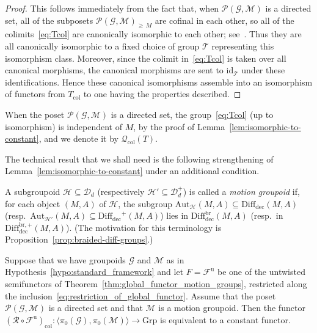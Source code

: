 \documentclass[AHL,Unicode,published]{cedram}
\newcommand{\Aut}{\mathrm{Aut}}
\newcommand{\id}{\mathrm{id}}
\newcommand{\groups}{\ensuremath{\mathrm{Grp}}}
\newcommand{\col}{\mathrm{col}}
\newcommand{\unt}{\mathrm{u}}
\newcommand{\rdec}{\mathrm{dec}}
\newcommand{\sR}{\mathscr{R}}
\newcommand{\cD}{\mathcal{D}}
\newcommand{\cF}{\mathcal{F}}
\newcommand{\cG}{\mathcal{G}}
\newcommand{\cH}{\mathcal{H}}
\newcommand{\cM}{\mathcal{M}}
\newcommand{\cP}{\mathcal{P}}
\newcommand{\cQ}{\mathcal{Q}}
\newcommand{\cT}{\mathcal{T}}
\newcommand{\diffdec}{\ensuremath{\mathrm{Diff}_{\rdec}}}
\newcommand{\diffdecbr}{\ensuremath{\mathrm{Diff}_{\rdec}^{\mathrm{br}}}}
\newcommand{\diffdecbrplus}{\ensuremath{\mathrm{Diff}_{\rdec}^{\mathrm{br},+}}}
\renewcommand{\geq}{\geqslant}
\begin{document}
\begin{proof}
This follows immediately from the fact that, when $\cP(\cG,\cM)$ is a directed set, all of the subposets $\cP(\cG,\cM)_{\geq\,M}$ are cofinal in each other, so all of the colimits~\eqref{eq:Tcol} are canonically isomorphic to each other; see~\cite[\href{https://stacks.math.columbia.edu/tag/04E7}{Lemma~04E7}]{stacks-project}. Thus they are all canonically isomorphic to a fixed choice of group $\cT$ representing this isomorphism class. Moreover, since the colimit in~\eqref{eq:Tcol} is taken over all canonical morphisms, the canonical morphisms are sent to $\id_\cT$ under these identifications. Hence these canonical isomorphisms assemble into an isomorphism of functors from $T_{\col}$ to one having the properties described.
\end{proof}

\begin{nota}\label{notation-Qcol}
When the poset $\cP(\cG,\cM)$ is a directed set, the group~\eqref{eq:Tcol} (up to isomorphism) is independent of $M$, by the proof of Lemma~\ref{lem:isomorphic-to-constant}, and we denote it by $\cQ_{\col}(T)$.
\end{nota}

The technical result that we shall need is the following strengthening of Lemma~\ref{lem:isomorphic-to-constant} under an additional condition.

\begin{defi}\label{def:motion-groupoid}
A subgroupoid $\cH \subseteq \cD_{d}$ (respectively $\cH' \subseteq \cD_{d}^{+}$) is called a \emph{motion groupoid} if, for each object $(M,A)$ of $\cH$, the subgroup $\Aut_\cH(M,A) \subseteq \diffdec(M,A)$ (resp.~$\Aut_{\cH'}(M,A) \subseteq \diffdec^{+}(M,A)$) lies in $\diffdecbr(M,A)$ (resp.~in $\diffdecbrplus(M,A)$). (The motivation for this terminology is Proposition~\ref{prop:braided-diff-groups}.)
\end{defi}

\begin{prop}\label{prop:equivalent-to-constant}
Suppose that we have groupoids $\cG$ and $\cM$ as in Hypothesis~\ref{hypo:standard_framework} and let $F = \cF^{\unt}$ be one of the untwisted semifunctors of Theorem~\ref{thm:global_functor_motion_groups}, restricted along the inclusion~\eqref{eq:restriction_of_global_functor}. Assume that the poset $\cP(\cG,\cM)$ is a directed set and that $\cM$ is a motion groupoid. Then the functor $(\sR \circ \cF^{\unt})_{\col} \colon \langle \pi_{0}(\cG), \pi_{0}(\cM) \rangle \to \groups$ is equivalent to a constant functor.
\end{prop}
\end{document}
